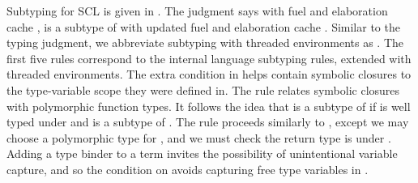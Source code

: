 Subtyping for SCL is given in
  .
The judgment
\ltiSsubtype{\ltimakeCombinedThreadedEnv{\ltiFuel{}}{\ltiClosureCache{}}}
            {\ltiEnv{}}
            {\ltiS{}}
            {\ltiT{}}
            {\ltimakeCombinedThreadedEnv{\ltiFuelp{}}{\ltiClosureCachep{}}}
            says with fuel \ltiFuel{} and elaboration cache \ltiClosureCache{},
            \ltiS{} is a subtype of 
            {\ltiT{}}
            with updated fuel \ltiFuelp{} and elaboration cache \ltiClosureCachep{}.
Similar to the typing judgment, we abbreviate subtyping
with threaded environments as
\ltiSsubtype{\ltiCombinedThreadedEnv{}}
            {\ltiEnv{}}
            {\ltiS{}}
            {\ltiT{}}
            {\ltiCombinedThreadedEnvp{}}.
The first five rules correspond to the internal language subtyping rules,
extended with threaded environments.
The extra condition in \ltiSCSFn helps contain symbolic closures
to the type-variable scope they were defined in.
The rule \ltiSCSClosure relates symbolic closures with polymorphic function types.
It follows the idea that \ltiClosureWithStkID{\ltiEnv{}}
                             {\ltiClosureID{}}
                             {\ltiufun{\ltivar{}}{\ltiE{}}}
                             is a subtype of
\ltiPolyFn{\ltiT{}}{\ova{\ltitvar{}}}{\ltiS{}}
if \ltifuntparamargrettype{\ova{\ltitvar{}}}
                          {\ltivar{}}
                          {\ltiT{}}
                          {\ltiSp{}}
                          {\ltiE{}}
is well typed under \ltiEnv{} and 
\ltiSp{}
is a subtype of
\ltiS{}.
The rule proceeds similarly to \ltiSCAppInfClosure, except we may choose a polymorphic
type for \ltiClosureID{}, and we must check the return type is under \ltiS{}.
Adding a type binder to a term invites the possibility of unintentional 
variable capture, and so 
the condition on \ova{\ltitvar{}} avoids capturing free type variables in \ltiE{}.

